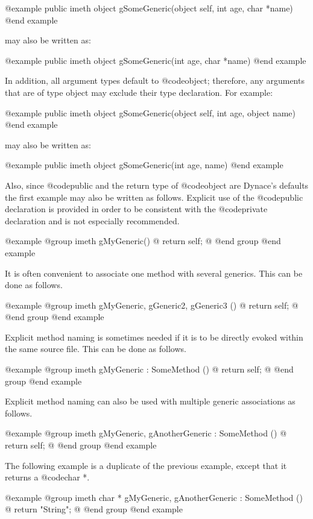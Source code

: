 @example
public  imeth   object  gSomeGeneric(object self, int age, char *name)
@end example

may also be written as:

@example
public  imeth   object  gSomeGeneric(int age, char *name)
@end example


In addition, all argument types default to @code{object}; therefore,
any arguments that are of type object may exclude their type
declaration.  For example:

@example
public  imeth   object  gSomeGeneric(object self, int age, object name)
@end example

may also be written as:

@example
public  imeth   object  gSomeGeneric(int age, name)
@end example


Also, since @code{public} and the return type of @code{object} are
Dynace's defaults the first example may also be written as follows.
Explicit use of the @code{public} declaration is provided in order to
be consistent with the @code{private} declaration and is not especially
recommended.

@example
@group
imeth   gMyGeneric()
@{
        return self;
@}
@end group
@end example




It is often convenient to associate one method with several generics.
This can be done as follows.

@example
@group
imeth   gMyGeneric, gGeneric2, gGeneric3 ()
@{
        return self;
@}
@end group
@end example


Explicit method naming is sometimes needed if it is to be directly
evoked within the same source file.  This can be done as follows.


@example
@group
imeth   gMyGeneric : SomeMethod ()
@{
        return self;
@}
@end group
@end example



Explicit method naming can also be used with multiple generic
associations as follows.

@example
@group
imeth   gMyGeneric, gAnotherGeneric : SomeMethod ()
@{
        return self;
@}
@end group
@end example





The following example is a duplicate of the previous example, except
that it returns a @code{char *}.

@example
@group
imeth   char * gMyGeneric, gAnotherGeneric : SomeMethod ()
@{
        return "String";
@}
@end group
@end example


